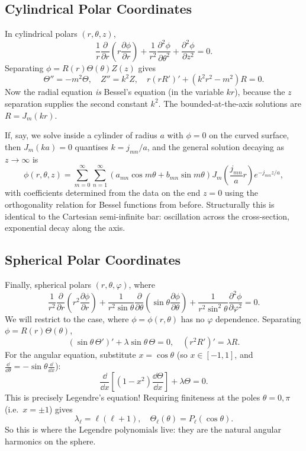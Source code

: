 \subsection{Cylindrical Polar Coordinates}

In cylindrical polars $(r, \theta, z)$,
$$
\frac{1}{r}\frac{\partial}{\partial r}\left(r \frac{\partial \phi}{\partial r}\right) + \frac{1}{r^2}\frac{\partial^2 \phi}{\partial \theta^2} + \frac{\partial^2 \phi}{\partial z^2} = 0.
$$
Separating $\phi = R(r)\Theta(\theta) Z(z)$ gives
$$
\Theta'' = -m^2 \Theta, \quad Z'' = k^2 Z, \quad r(rR')' + (k^2 r^2 - m^2) R = 0.
$$
Now the radial equation \emph{is} Bessel's equation (in the variable $kr$), because the $z$ separation supplies the second constant $k^2$. The bounded-at-the-axis solutions are $R = J_m(kr)$.

If, say, we solve inside a cylinder of radius $a$ with $\phi = 0$ on the curved surface, then $J_m(ka) = 0$ quantises $k = j_{mn}/a$, and the general solution decaying as $z \rightarrow \infty$ is
$$
\phi(r, \theta, z) = \sum_{m = 0}^{\infty}\sum_{n = 1}^{\infty} \left(a_{mn} \cos m \theta + b_{mn} \sin m \theta\right) J_m\left(\frac{j_{mn}}{a} r\right) e^{-j_{mn}z/a},
$$
with coefficients determined from the data on the end $z = 0$ using the orthogonality relation for Bessel functions from before. Structurally this is identical to the Cartesian semi-infinite bar: oscillation across the cross-section, exponential decay along the axis.

\subsection{Spherical Polar Coordinates}

Finally, spherical polars $(r, \theta, \varphi)$, where
$$
\frac{1}{r^2}\frac{\partial}{\partial r}\left(r^2 \frac{\partial \phi}{\partial r}\right) + \frac{1}{r^2 \sin \theta} \frac{\partial}{\partial \theta}\left(\sin \theta \frac{\partial \phi}{\partial \theta}\right) + \frac{1}{r^2 \sin^2 \theta} \frac{\partial^2 \phi}{\partial \varphi^2} = 0.
$$
We will restrict to the  case, where $\phi = \phi(r, \theta)$ has no $\varphi$ dependence. Separating $\phi = R(r) \Theta(\theta)$,
$$
(\sin \theta \, \Theta')' + \lambda \sin \theta\, \Theta = 0, \quad (r^2 R')' = \lambda R.
$$
For the angular equation, substitute $x = \cos \theta$ (so $x \in [-1, 1]$, and $\frac{\dd}{\dd \theta} = -\sin\theta \frac{\dd}{\dd x}$):
$$
\frac{\dd}{\dd x}\left[(1 - x^2) \frac{\dd \Theta}{\dd x}\right] + \lambda \Theta = 0.
$$
This is precisely Legendre's equation! Requiring finiteness at the poles $\theta = 0, \pi$ (i.e.\ $x = \pm 1$) gives
$$
\lambda_\ell = \ell (\ell + 1), \quad \Theta_\ell(\theta) = P_\ell(\cos \theta).
$$
So this is where the Legendre polynomials live: they are the natural angular harmonics on the sphere.

